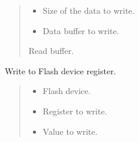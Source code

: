 \documentclass[letterpaper,10pt,english]{sphinxmanual}
\begin{document}
\begin{fulllineitems}
\begin{fulllineitems}
\begin{quote}
\begin{description}
\begin{itemize}
\item {} 
\sphinxAtStartPar
{} \textendash{} Size of the data to write.

\item {} 
\sphinxAtStartPar
{} \textendash{} Data buffer to write.

\end{itemize}

\sphinxAtStartPar
Read buffer.

\end{description}\end{quote}

\end{fulllineitems}


\begin{fulllineitems}
\label{\detokenize{cplddocs:management_flash.MngProgFlash.FlashDevice_writeReg}}
\pysigstartsignatures
{}
\pysigstopsignatures
\sphinxAtStartPar
Write to Flash device register.
\begin{quote}\begin{description}
\begin{itemize}
\item {} 
\sphinxAtStartPar
{} \textendash{} Flash device.

\item {} 
\sphinxAtStartPar
{} \textendash{} Register to write.

\item {} 
\sphinxAtStartPar
{} \textendash{} Value to write.

\end{itemize}

\end{description}\end{quote}

\end{fulllineitems}


\end{fulllineitems}
\end{document}
